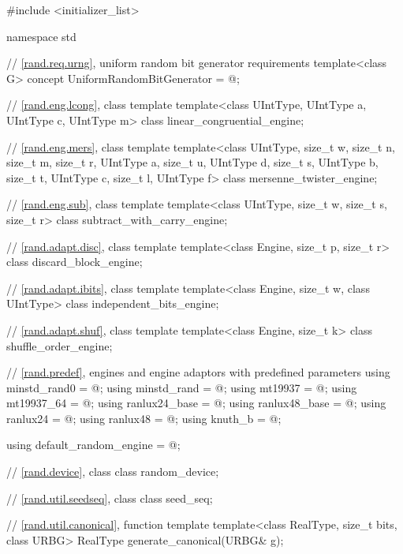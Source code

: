 \begin{codeblock}
#include <initializer_list>

namespace std {
  // \ref{rand.req.urng}, uniform random bit generator requirements
  template<class G>
    concept UniformRandomBitGenerator = @\seebelow@;

  // \ref{rand.eng.lcong}, class template 
  template<class UIntType, UIntType a, UIntType c, UIntType m>
    class linear_congruential_engine;

  // \ref{rand.eng.mers}, class template 
  template<class UIntType, size_t w, size_t n, size_t m, size_t r,
           UIntType a, size_t u, UIntType d, size_t s,
           UIntType b, size_t t,
           UIntType c, size_t l, UIntType f>
    class mersenne_twister_engine;

  // \ref{rand.eng.sub}, class template 
  template<class UIntType, size_t w, size_t s, size_t r>
    class subtract_with_carry_engine;

  // \ref{rand.adapt.disc}, class template 
  template<class Engine, size_t p, size_t r>
    class discard_block_engine;

  // \ref{rand.adapt.ibits}, class template 
  template<class Engine, size_t w, class UIntType>
    class independent_bits_engine;

  // \ref{rand.adapt.shuf}, class template 
  template<class Engine, size_t k>
    class shuffle_order_engine;

  // \ref{rand.predef}, engines and engine adaptors with predefined parameters
  using minstd_rand0  = @\seebelow@;
  using minstd_rand   = @\seebelow@;
  using mt19937       = @\seebelow@;
  using mt19937_64    = @\seebelow@;
  using ranlux24_base = @\seebelow@;
  using ranlux48_base = @\seebelow@;
  using ranlux24      = @\seebelow@;
  using ranlux48      = @\seebelow@;
  using knuth_b       = @\seebelow@;

  using default_random_engine = @\seebelow@;

  // \ref{rand.device}, class 
  class random_device;

  // \ref{rand.util.seedseq}, class 
  class seed_seq;

  // \ref{rand.util.canonical}, function template 
  template<class RealType, size_t bits, class URBG>
    RealType generate_canonical(URBG& g);

}
\end{codeblock}
